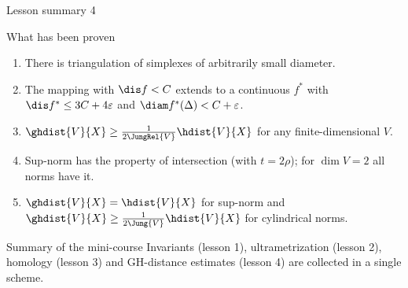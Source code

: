 \documentclass[aspectratio=169,11pt]{beamer}
\begin{document}
\begin{frame}{Lesson summary \textup{4}}
\begin{block}{What has been proven}
\begin{enumerate}
\item There is triangulation of simplexes of arbitrarily small diameter.
\item The mapping with $\dis f < C$ extends to a continuous $f^*$ with $\dis f^* \le 3C+4\varepsilon$ and $\diam f^*(\Delta) < C+\varepsilon$.
\item $\ghdist{V}{X} \ge \frac{1}{2\JungRel{V}}\hdist{V}{X}$ for any finite-dimensional $V$.
\item Sup-norm has the property of intersection \textup{(}with $t = 2\rho$\textup{)}\textup{;} for $\dim V = 2$ all norms have it.
\item $\ghdist{V}{X} = \hdist{V}{X}$ for sup-norm and $\ghdist{V}{X} \ge \frac{1}{2\Jung{V}}\hdist{V}{X}$ for cylindrical norms.
\end{enumerate}
\end{block}
\begin{block}{Summary of the mini-course}
Invariants \textup{(}lesson \textup{1}\textup{)}, ultrametrization \textup{(}lesson \textup{2}\textup{)}, homology \textup{(}lesson \textup{3}\textup{)} and GH-distance estimates \textup{(}lesson \textup{4}\textup{)} are collected in a single scheme.
\end{block}
\end{frame}
\end{document}

